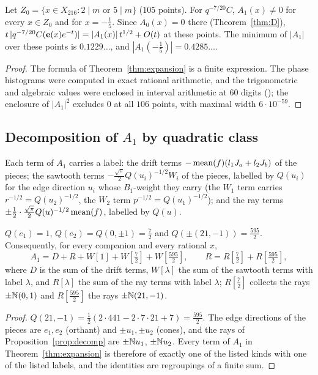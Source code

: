 \begin{proposition}\label{prop:A1nonzero}
Let $Z_0=\{x\in X_{216}:2\mid m\text{ or }5\mid m\}$ ($105$ points). For $q^{-7/20}C$, $A_1(x)\ne0$ for every $x\in Z_0$ and for $x=-\frac15$. Since $A_0(x)=0$
there (Theorem~\ref{thm:D}), $t\,|q^{-7/20}C(\mathbf{e}(x)e^{-t})|=|A_1(x)|\,t^{1/2}+O(t)$ at these points. The minimum of $|A_1|$ over these points is
$0.1229\ldots$, and $|A_1(-\frac15)|=0.4285\ldots$.
\end{proposition}
\begin{proof}
The formula of Theorem~\ref{thm:expansion} is a finite expression. The phase histograms were computed in exact rational arithmetic, and the trigonometric
and algebraic values were enclosed in interval arithmetic at $60$ digits (); the enclosure of $|A_1|^2$
excludes $0$ at all $106$ points, with maximal width $6\cdot10^{-59}$.
\end{proof}

\subsection{Decomposition of $A_1$ by quadratic class}
Each term of $A_1$ carries a label: the drift terms $-\operatorname{mean}(f)(l_1J_a+l_2J_b)$ of the pieces; the sawtooth terms $-\frac{\sqrt\pi}2Q(u_i)^{-1/2}W_i$ of the pieces,
labelled by $Q(u_i)$ for the edge direction $u_i$ whose $B_1$-weight they carry (the $W_1$ term carries $r^{-1/2}=Q(u_2)^{-1/2}$, the $W_2$ term $p^{-1/2}=Q(u_1)^{-1/2}$);
and the ray terms $\pm\frac12\cdot\frac{\sqrt\pi}2Q(u)^{-1/2}\operatorname{mean}(f)$, labelled by $Q(u)$.
\begin{proposition}\label{prop:A1split}
$Q(e_1)=1$, $Q(e_2)=Q(0,\pm1)=\frac72$ and $Q(\pm(21,-1))=\frac{595}2$. Consequently, for every companion and every rational $x$,
\[
A_1=D+R+W[1]+W[\tfrac72]+W[\tfrac{595}2],\qquad R=R[\tfrac72]+R[\tfrac{595}2],
\]
where $D$ is the sum of the drift terms, $W[\lambda]$ the sum of the sawtooth terms with label $\lambda$, and $R[\lambda]$ the sum of the ray terms with label $\lambda$;
$R[\frac72]$ collects the rays $\pm\mathbb{N}(0,1)$ and $R[\frac{595}2]$ the rays $\pm\mathbb{N}(21,-1)$.
\end{proposition}
\begin{proof}
$Q(21,-1)=\frac12(2\cdot441-2\cdot7\cdot21+7)=\frac{595}2$. The edge directions of the pieces are $e_1,e_2$ (orthant) and $\pm u_1,\pm u_2$ (cones), and the rays of
Proposition~\ref{prop:decomp} are $\pm\mathbb{N} u_1$, $\pm\mathbb{N} u_2$. Every term of $A_1$ in Theorem~\ref{thm:expansion} is therefore of exactly one of the listed kinds with one of
the listed labels, and the identities are regroupings of a finite sum.
\end{proof}

